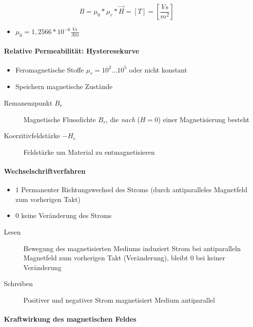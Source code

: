 $$B = \mu_0 * \mu_r * \vec{H} = [T] = \left[\frac{Vs}{m^2}\right]$$

\begin{itemize}
  \item $\mu_0 = 1,2566 * 10^{-6} \frac{Vs}{Am}$
\end{itemize}

\paragraph{Relative Permeabilität: Hysteresekurve}

\begin{itemize}
  \item Feromagnetische Stoffe $\mu_r = 10^2 \dots 10^5$ oder nicht konstant
  \item Speichern magnetische Zustände
\end{itemize}

\begin{description}
  \item[Remanenzpunkt $B_r$] Magnetische Flussdichte $B_r$, die \emph{nach} ($H = 0$) einer Magnetisierung besteht
  \item[Koerzitivfeldstärke $-H_c$] Feldstärke um Material zu entmagnetisieren
\end{description}

\paragraph{Wechselschriftverfahren}

\begin{itemize}
  \item $1$ Permanenter Richtungswechsel des Stroms (durch antiparalleles Magnetfeld zum vorherigen Takt)
  \item $0$ keine Veränderung des Stroms
\end{itemize}

\begin{description}
  \item[Lesen] Bewegung des magnetisierten Mediums induziert Strom bei antiparalleln Magnetfeld zum vorherigen Takt (Veränderung), bleibt $0$ bei keiner Veränderung
  \item[Schreiben] Positiver und negativer Strom magnetisiert Medium antiparallel
\end{description}

\paragraph{Kraftwirkung des magnetischen Feldes}

